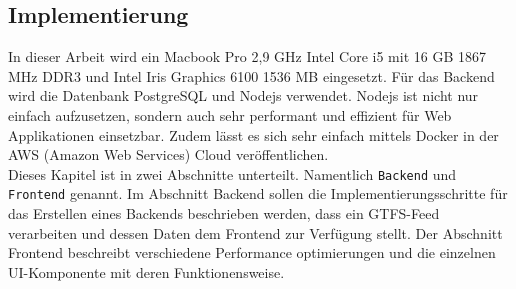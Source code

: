 \begin{newpage}
\section{Implementierung}
\label{sec:implementierung}


  In dieser Arbeit wird ein Macbook Pro 2,9 GHz Intel Core i5 mit 16 GB 1867 MHz DDR3 und Intel Iris Graphics 6100 1536 MB eingesetzt.
  Für das Backend wird die Datenbank PostgreSQL und Nodejs verwendet. Nodejs ist nicht nur einfach aufzusetzen, sondern auch sehr performant und effizient für Web Applikationen einsetzbar. Zudem lässt es sich sehr einfach mittels Docker in der AWS (Amazon Web Services) Cloud veröffentlichen.\\

  Dieses Kapitel ist in zwei Abschnitte unterteilt. Namentlich \texttt{Backend} und \texttt{Frontend} genannt. Im Abschnitt Backend sollen die Implementierungsschritte für das Erstellen eines Backends beschrieben werden, dass ein GTFS-Feed verarbeiten und dessen Daten dem Frontend zur Verfügung stellt. Der Abschnitt Frontend beschreibt verschiedene Performance optimierungen und die einzelnen UI-Komponente mit deren Funktionensweise.

  

  

\end{newpage}